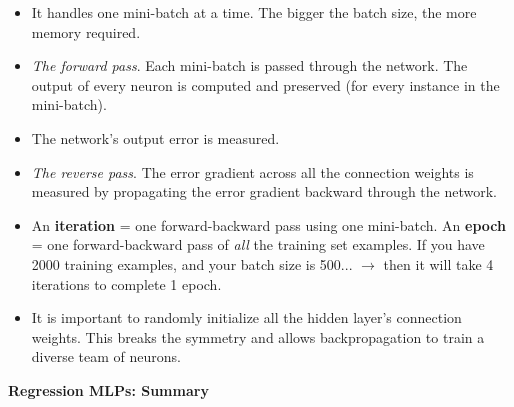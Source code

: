 \vspace{-5.0mm}
\begin{itemize}
\item
It handles one mini-batch at a time. The bigger the batch size, the more memory required.

\item
\vspace{-2.0mm}
\textit{The forward pass}.
Each mini-batch is passed through the network.
The output of every neuron is computed and preserved (for every instance in the mini-batch).

\item
\vspace{-2.0mm}
The network's output error is measured.

\item
\vspace{-2.0mm}
\textit{The reverse pass}.
The error gradient across all the connection weights is measured
by propagating the error gradient backward through the network.

\item
\vspace{-2.0mm}
An \textbf{iteration} = one forward-backward pass using one mini-batch.\newline
An \textbf{epoch} = one forward-backward pass of \textit{all} the training set examples.\newline
If you have 2000 training examples, and your batch size is 500...\newline
$\rightarrow$ then it will take 4 iterations to complete 1 epoch.

\item
\vspace{-2.0mm}
It is important to randomly initialize all the hidden layer's connection weights.\newline
This breaks the symmetry and allows backpropagation to train a diverse team of neurons.

\end{itemize}

\textbf{Regression MLPs: Summary}

